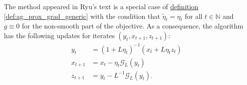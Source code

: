         \begin{definition}
        \label{def:ag_tri_pt_form_E}
            The method appeared in Ryu's text is a special case of 
            \hyperref[def:ag_prox_grad_generic]{definition \ref*{def:ag_prox_grad_generic}}
            with the condition that $\tilde \eta_t = \eta_t$ for all $t \in \mathbb N$ and $g \equiv 0$ for the non-smooth part of the objective. 
            As a consequence, the algorithm has the following updates for iterates $(y_t, x_{t + 1}, z_{t + 1})$: 
            \begin{align*}
                y_t &= (1 + L\eta_t)^{-1}(x_t + L\eta_t z_t)
                \\
                x_{t + 1} &= x_t - \eta_t \mathcal G_L(y_t)
                \\
                z_{t + 1} &= y_t - L^{-1}\mathcal G_L(y_t).
            \end{align*}
        \end{definition}

